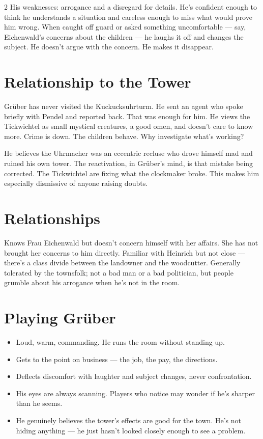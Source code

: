 \documentclass[10pt,letterpaper]{article}
\begin{document}
\begin{multicols}{2}
His weaknesses: arrogance and a disregard for details. He's confident enough to think he understands a situation and careless enough to miss what would prove him wrong. When caught off guard or asked something uncomfortable --- say, Eichenwald's concerns about the children --- he laughs it off and changes the subject. He doesn't argue with the concern. He makes it disappear.

\section*{Relationship to the Tower}
Grüber has never visited the Kuckucksuhrturm. He sent an agent who spoke briefly with Pendel and reported back. That was enough for him. He views the Tickwichtel as small mystical creatures, a good omen, and doesn't care to know more. Crime is down. The children behave. Why investigate what's working?

He believes the Uhrmacher was an eccentric recluse who drove himself mad and ruined his own tower. The reactivation, in Grüber's mind, is that mistake being corrected. The Tickwichtel are fixing what the clockmaker broke. This makes him especially dismissive of anyone raising doubts.

\section*{Relationships}
Knows Frau Eichenwald but doesn't concern himself with her affairs. She has not brought her concerns to him directly. Familiar with Heinrich but not close --- there's a class divide between the landowner and the woodcutter. Generally tolerated by the townsfolk; not a bad man or a bad politician, but people grumble about his arrogance when he's not in the room.

\section*{Playing Grüber}
\begin{itemize}
\item Loud, warm, commanding. He runs the room without standing up.
\item Gets to the point on business --- the job, the pay, the directions.
\item Deflects discomfort with laughter and subject changes, never confrontation.
\item His eyes are always scanning. Players who notice may wonder if he's sharper than he seems.
\item He genuinely believes the tower's effects are good for the town. He's not hiding anything --- he just hasn't looked closely enough to see a problem.
\end{itemize}

\end{multicols}
\end{document}
